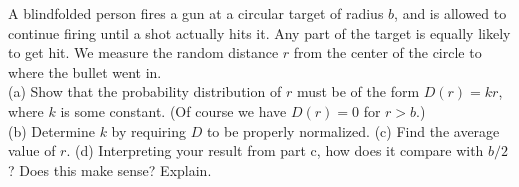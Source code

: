 A blindfolded person fires a gun at a circular target of radius $b$, and is
allowed to continue firing until a shot actually hits it. Any part of the
target is equally likely to get hit. We measure the random distance
$r$ from the center of the circle to where the bullet went in.\\
(a) Show that the probability distribution of $r$ must be of the
form $D(r)=kr$, where $k$ is some constant. (Of course we have
$D(r)=0$ for $r>b$.)\\
(b) Determine $k$ by requiring $D$ to be properly normalized.\answercheck\hwendpart
(c) Find the average value of $r$.\answercheck\hwendpart
(d) Interpreting your result from part c, how does it compare with
$b/2$? Does this make sense? Explain.
